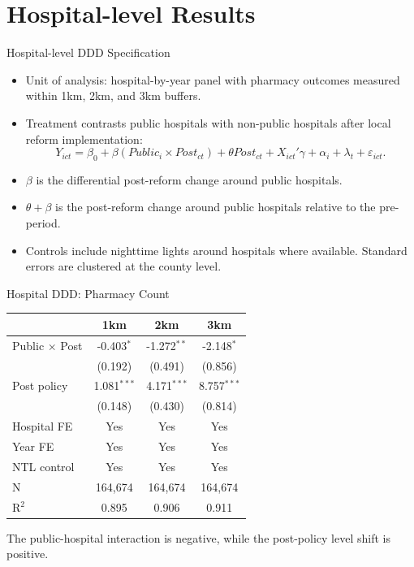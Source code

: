 \documentclass{beamer}
\begin{document}
\section{Hospital-level Results}

\begin{frame}{Hospital-level DDD Specification}

\small
\begin{itemize}\setlength\itemsep{0.7em}
    \item Unit of analysis: hospital-by-year panel with pharmacy outcomes measured within 1km, 2km, and 3km buffers.
    \item Treatment contrasts public hospitals with non-public hospitals after local reform implementation:
    \[
        Y_{ict}=\beta_0+\beta(Public_i\times Post_{ct})+\theta Post_{ct}
        +X_{ict}'\gamma+\alpha_i+\lambda_t+\varepsilon_{ict}.
    \]
    \item $\beta$ is the differential post-reform change around public hospitals.

    \item $\theta+\beta$ is the post-reform change around public hospitals relative to the pre-period.
    \item Controls include nighttime lights around hospitals where available. Standard errors are clustered at the county level.
    
\end{itemize}

\end{frame}

\begin{frame}{Hospital DDD: Pharmacy Count}

\centering
\scriptsize
\setlength{\tabcolsep}{7pt}

\begin{tabular}{lccc}
\toprule
& 1km & 2km & 3km \\
\midrule
Public $\times$ Post
& -0.403$^{*}$ & -1.272$^{**}$ & -2.148$^{*}$ \\
& (0.192) & (0.491) & (0.856) \\
\addlinespace
Post policy
& 1.081$^{***}$ & 4.171$^{***}$ & 8.757$^{***}$ \\
& (0.148) & (0.430) & (0.814) \\
\midrule
Hospital FE & Yes & Yes & Yes \\
Year FE & Yes & Yes & Yes \\
NTL control & Yes & Yes & Yes \\
\midrule
N & 164,674 & 164,674 & 164,674 \\
R$^2$ & 0.895 & 0.906 & 0.911 \\
\bottomrule
\end{tabular}

\vspace{0.6em}
\raggedright
\tiny The public-hospital interaction is negative, while the post-policy level shift is positive.

\end{frame}
\end{document}
